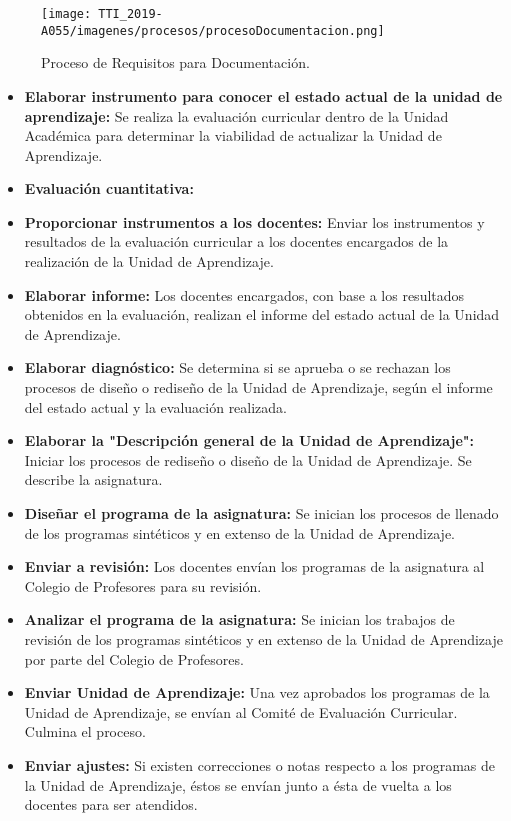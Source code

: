 \begin{figure}[H]
        \centering
        \texttt{[image: TTI\_2019-A055/imagenes/procesos/procesoDocumentacion.png]}
        \caption{Proceso de Requisitos para Documentación.}
        \label{fig:MCD}
    \end{figure}
\newpage
\begin{itemize}
	\item \textbf{Elaborar instrumento para conocer el estado actual de la unidad de aprendizaje:} Se realiza la evaluación curricular dentro de la Unidad Académica para determinar la viabilidad de actualizar la Unidad de Aprendizaje.
	\item \textbf{Evaluación cuantitativa:}
	\item \textbf{Proporcionar instrumentos a los docentes:} Enviar los instrumentos y resultados de la evaluación curricular a los docentes encargados de la realización de la Unidad de Aprendizaje.
	\item \textbf{Elaborar informe:} Los docentes encargados, con base a los resultados obtenidos en la evaluación, realizan el informe del estado actual de la Unidad de Aprendizaje.
	\item \textbf{Elaborar diagnóstico:} Se determina si se aprueba o se rechazan los procesos de diseño o rediseño de la Unidad de Aprendizaje, según el informe del estado actual y la evaluación realizada.
	\item \textbf{Elaborar la "Descripción general de la Unidad de Aprendizaje":} Iniciar los procesos de rediseño o diseño de la Unidad de Aprendizaje. Se describe la asignatura.
	
	\item \textbf{Diseñar el programa de la asignatura:} Se inician los procesos de llenado de los programas sintéticos y en extenso de la Unidad de Aprendizaje.
	\item \textbf{Enviar a revisión:}  Los docentes envían los programas de la asignatura al Colegio de Profesores para su revisión.
	\item \textbf{Analizar el programa de la asignatura:} Se inician los trabajos de revisión de los programas sintéticos y en extenso de la Unidad de Aprendizaje por parte del Colegio de Profesores.
	
	\item \textbf{Enviar Unidad de Aprendizaje:}  Una vez aprobados los programas de la Unidad de Aprendizaje, se envían al Comité de Evaluación Curricular. Culmina el proceso.
	\item \textbf{Enviar ajustes:} Si existen correcciones o notas respecto a los programas de la Unidad de Aprendizaje, éstos se envían junto a ésta de vuelta a los docentes para ser atendidos.    
\end{itemize}

